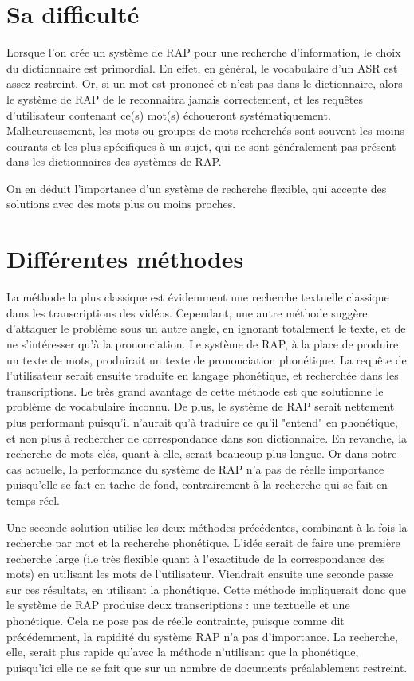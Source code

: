 	\section{Sa difficulté}
	Lorsque l'on crée un système de RAP pour une recherche d'information, le choix du dictionnaire est primordial. En effet, en général, le vocabulaire d'un ASR est assez restreint. Or, si un mot est prononcé et n'est pas dans le dictionnaire, alors le système de RAP de le reconnaitra jamais correctement, et les requêtes d'utilisateur contenant ce(s) mot(s) échoueront systématiquement. Malheureusement, les mots ou groupes de mots recherchés sont souvent les moins courants et les plus spécifiques à un sujet, qui ne sont généralement pas présent dans les dictionnaires des systèmes de RAP.
	
	On en déduit l'importance d'un système de recherche flexible, qui accepte des solutions avec des mots plus ou moins proches.
	
	\section{Différentes méthodes}
	La méthode la plus classique est évidemment une recherche textuelle classique dans les transcriptions des vidéos. Cependant, une autre méthode suggère d'attaquer le problème sous un autre angle, en ignorant totalement le texte, et de ne s'intéresser qu'à la prononciation. Le système de RAP, à la place de produire un texte de mots, produirait un texte de prononciation phonétique. La requête de l'utilisateur serait ensuite traduite en langage phonétique, et recherchée dans les transcriptions. Le très grand avantage de cette méthode est que solutionne le problème de vocabulaire inconnu. De plus, le système de RAP serait nettement plus performant puisqu'il n'aurait qu'à traduire ce qu'il "entend" en phonétique, et non plus à rechercher de correspondance dans son dictionnaire. En revanche, la recherche de mots clés, quant à elle, serait beaucoup plus longue. Or dans notre cas actuelle, la performance du système de RAP n'a pas de réelle importance puisqu'elle se fait en tache de fond, contrairement à la recherche qui se fait en temps réel.
	
	Une seconde solution utilise les deux méthodes précédentes, combinant à la fois la recherche par mot et la recherche phonétique. L'idée serait de faire une première recherche large (i.e très flexible quant à l'exactitude de la correspondance des mots) en utilisant les mots de l'utilisateur. Viendrait ensuite une seconde passe sur ces résultats, en utilisant la phonétique. Cette méthode impliquerait donc que le système de RAP produise deux transcriptions : une textuelle et une phonétique. Cela ne pose pas de réelle contrainte, puisque comme dit précédemment, la rapidité du système RAP n'a pas d'importance. La recherche, elle, serait plus rapide qu'avec la méthode n'utilisant que la phonétique, puisqu'ici elle ne se fait que sur un nombre de documents préalablement restreint.
	
	
	
	
	
	

	
	
	
	
	
	
	
	
	
	
	
		
	\nocite{introduction-hmm}
	\nocite{tutorial-hmm}
	